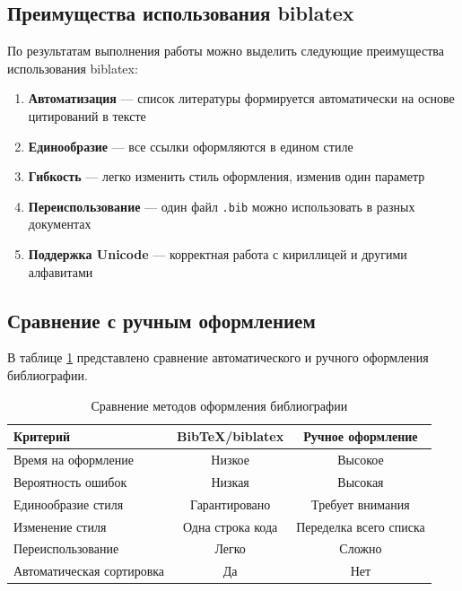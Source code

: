 \documentclass[12pt, a4paper]{article}
\begin{document}
\subsection{Преимущества использования biblatex}

По результатам выполнения работы можно выделить следующие преимущества использования biblatex:

\begin{enumerate}
  \item \textbf{Автоматизация} — список литературы формируется автоматически на основе цитирований в тексте
  \item \textbf{Единообразие} — все ссылки оформляются в едином стиле
  \item \textbf{Гибкость} — легко изменить стиль оформления, изменив один параметр
  \item \textbf{Переиспользование} — один файл \texttt{.bib} можно использовать в разных документах
  \item \textbf{Поддержка Unicode} — корректная работа с кириллицей и другими алфавитами
\end{enumerate}

\subsection{Сравнение с ручным оформлением}

В таблице \ref{tab:comparison} представлено сравнение автоматического и ручного оформления библиографии.

\begin{table}[htbp]
  \centering
  \caption{Сравнение методов оформления библиографии}
  \label{tab:comparison}
  \begin{tabular}{@{}lcc@{}}
    \toprule
    \textbf{Критерий} & \textbf{BibTeX/biblatex} & \textbf{Ручное оформление} \\
    \midrule
    Время на оформление & Низкое & Высокое \\
    Вероятность ошибок & Низкая & Высокая \\
    Единообразие стиля & Гарантировано & Требует внимания \\
    Изменение стиля & Одна строка кода & Переделка всего списка \\
    Переиспользование & Легко & Сложно \\
    Автоматическая сортировка & Да & Нет \\
    \bottomrule
  \end{tabular}
\end{table}
\end{document}

